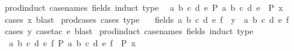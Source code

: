 \begin{isabellebody}
\endisatagproof
{\isafoldproof}%
%
\isadelimproof
\isanewline
%
\endisadelimproof
\isanewline
{}\isamarkupfalse%
\ prod{\isacharunderscore}{\kern0pt}induct{}\ {\isacharbrackleft}{\kern0pt}case{\isacharunderscore}{\kern0pt}names\ fields{\isacharcomma}{\kern0pt}\ induct\ type{\isacharbrackright}{\kern0pt}{\isacharcolon}{\kern0pt}\isanewline
\ \ {\isachardoublequoteopen}{\isacharparenleft}{\kern0pt}{\isasymAnd}a\ b\ c\ d\ e{\isachardot}{\kern0pt}\ P\ {\isacharparenleft}{\kern0pt}a{\isacharcomma}{\kern0pt}\ b{\isacharcomma}{\kern0pt}\ c{\isacharcomma}{\kern0pt}\ d{\isacharcomma}{\kern0pt}\ e{\isacharparenright}{\kern0pt}{\isacharparenright}{\kern0pt}\ {\isasymLongrightarrow}\ P\ x{\isachardoublequoteclose}\isanewline
%
\isadelimproof
\ \ %
\endisadelimproof
%
\isatagproof
{}\isamarkupfalse%
\ {\isacharparenleft}{\kern0pt}cases\ x{\isacharparenright}{\kern0pt}\ blast%
\endisatagproof
{\isafoldproof}%
%
\isadelimproof
\isanewline
%
\endisadelimproof
\isanewline
{}\isamarkupfalse%
\ prod{\isacharunderscore}{\kern0pt}cases{}\ {\isacharbrackleft}{\kern0pt}cases\ type{\isacharbrackright}{\kern0pt}{\isacharcolon}{\kern0pt}\isanewline
\ \ \ {\isacharparenleft}{\kern0pt}fields{\isacharparenright}{\kern0pt}\ a\ b\ c\ d\ e\ f\ \ {\isachardoublequoteopen}y\ {\isacharequal}{\kern0pt}\ {\isacharparenleft}{\kern0pt}a{\isacharcomma}{\kern0pt}\ b{\isacharcomma}{\kern0pt}\ c{\isacharcomma}{\kern0pt}\ d{\isacharcomma}{\kern0pt}\ e{\isacharcomma}{\kern0pt}\ f{\isacharparenright}{\kern0pt}{\isachardoublequoteclose}\isanewline
%
\isadelimproof
\ \ %
\endisadelimproof
%
\isatagproof
{}\isamarkupfalse%
\ {\isacharparenleft}{\kern0pt}cases\ y{\isacharcomma}{\kern0pt}\ case{\isacharunderscore}{\kern0pt}tac\ e{\isacharparenright}{\kern0pt}\ blast%
\endisatagproof
{\isafoldproof}%
%
\isadelimproof
\isanewline
%
\endisadelimproof
\isanewline
{}\isamarkupfalse%
\ prod{\isacharunderscore}{\kern0pt}induct{}\ {\isacharbrackleft}{\kern0pt}case{\isacharunderscore}{\kern0pt}names\ fields{\isacharcomma}{\kern0pt}\ induct\ type{\isacharbrackright}{\kern0pt}{\isacharcolon}{\kern0pt}\isanewline
\ \ {\isachardoublequoteopen}{\isacharparenleft}{\kern0pt}{\isasymAnd}a\ b\ c\ d\ e\ f{\isachardot}{\kern0pt}\ P\ {\isacharparenleft}{\kern0pt}a{\isacharcomma}{\kern0pt}\ b{\isacharcomma}{\kern0pt}\ c{\isacharcomma}{\kern0pt}\ d{\isacharcomma}{\kern0pt}\ e{\isacharcomma}{\kern0pt}\ f{\isacharparenright}{\kern0pt}{\isacharparenright}{\kern0pt}\ {\isasymLongrightarrow}\ P\ x{\isachardoublequoteclose}\isanewline

\end{isabellebody}
